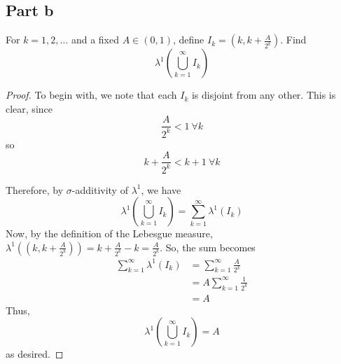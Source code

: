 \documentclass[fontsize=11pt]{scrartcl} %
\numberwithin{equation}{section} %
\numberwithin{figure}{section} %
\numberwithin{table}{section} %
\begin{document}
\subsection*{Part b}
For $k=1,2,\ldots$ and a fixed $A\in(0,1)$, define $I_k = (k,k+\frac{A}{2^k})$.
Find
\[
\lambda^1\left(\bigcup_{k=1}^{\infty}I_k\right)
\]

\begin{proof}
To begin with, we note that each $I_k$ is disjoint from any other. This is clear, since
\[
\frac{A}{2^k} < 1\ \forall k
\]
so
\[
k+\frac{A}{2^k} < k+1\ \forall k
\]

Therefore, by $\sigma$-additivity of $\lambda^1$, we have
\[
\lambda^1\left(\bigcup_{k=1}^{\infty}I_k\right) = \sum_{k=1}^{\infty}\lambda^1(I_k)
\]
Now, by the definition of the Lebesgue measure, $\lambda^1((k,k+\frac{A}{2^k})) = k+\frac{A}{2^k} - k = \frac{A}{2^k}$.
So, the sum becomes
\[
\begin{aligned}
\sum_{k=1}^{\infty}\lambda^1(I_k)   &= \sum_{k=1}^{\infty}\frac{A}{2^k}\\
                                    &= A\sum_{k=1}^{\infty}\frac{1}{2^k}\\
                                    &= A
\end{aligned}
\]
Thus, 
\[
\lambda^1\left(\bigcup_{k=1}^{\infty}I_k\right) = A
\]
as desired.
\end{proof}



\end{document}
